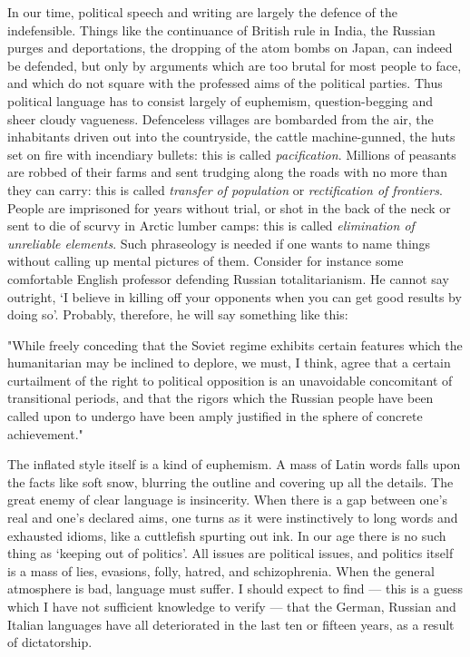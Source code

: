 \documentclass[12pt]{article}
\begin{document}
In our time, political speech and writing are largely the defence of the indefensible. Things like the continuance of British rule in India, the Russian purges and deportations, the dropping of the atom bombs on Japan, can indeed be defended, but only by arguments which are too brutal for most people to face, and which do not square with the professed aims of the political parties. Thus political language has to consist largely of euphemism, question-begging and sheer cloudy vagueness. Defenceless villages are bombarded from the air, the inhabitants driven out into the countryside, the cattle machine-gunned, the huts set on fire with incendiary bullets: this is called \textit{pacification}. Millions of peasants are robbed of their farms and sent trudging along the roads with no more than they can carry: this is called \textit{transfer of population} or \textit{rectification of frontiers}. People are imprisoned for years without trial, or shot in the back of the neck or sent to die of scurvy in Arctic lumber camps: this is called \textit{elimination of unreliable elements}. Such phraseology is needed if one wants to name things without calling up mental pictures of them. Consider for instance some comfortable English professor defending Russian totalitarianism. He cannot say outright, `I believe in killing off your opponents when you can get good results by doing so’. Probably, therefore, he will say something like this:
\begin{displayquote}
"While freely conceding that the Soviet regime exhibits certain features which the humanitarian may be inclined to deplore, we must, I think, agree that a certain curtailment of the right to political opposition is an unavoidable concomitant of transitional periods, and that the rigors which the Russian people have been called upon to undergo have been amply justified in the sphere of concrete achievement."
\end{displayquote}
The inflated style itself is a kind of euphemism. A mass of Latin words falls upon the facts like soft snow, blurring the outline and covering up all the details. The great enemy of clear language is insincerity. When there is a gap between one's real and one's declared aims, one turns as it were instinctively to long words and exhausted idioms, like a cuttlefish spurting out ink. In our age there is no such thing as `keeping out of politics’. All issues are political issues, and politics itself is a mass of lies, evasions, folly, hatred, and schizophrenia. When the general atmosphere is bad, language must suffer. I should expect to find — this is a guess which I have not sufficient knowledge to verify — that the German, Russian and Italian languages have all deteriorated in the last ten or fifteen years, as a result of dictatorship.
\end{document}
